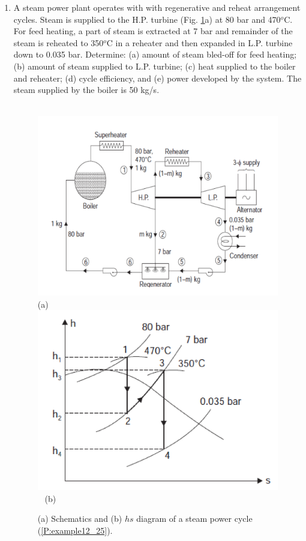 \documentclass[12pts,a4paper,amsmath,amssymb,floatfix]{article}%
\begin{document}
\begin{enumerate}[label=\bfseries Problem \arabic*]
\item\label{P:example12_25} A steam power plant operates with with regenerative and reheat arrangement cycles. Steam is supplied to the H.P. turbine (Fig. \ref{example12_25}a) at 80 bar and 470$^{o}$C.  For feed heating, a part of steam is extracted at 7 bar and remainder of the steam is reheated to 350$^{o}$C in a reheater and then expanded in L.P. turbine down to 0.035 bar. Determine: (a) amount of steam bled-off for feed heating; (b) amount of steam supplied to L.P. turbine; (c) heat supplied to the boiler and reheater; (d) cycle efficiency, and (e) power developed by the system. The steam supplied by the boiler is 50 kg/s.
   \begin{figure}[h]
    \begin{center}
    \vbox{
     \hbox{\hspace{1cm}
      \includegraphics[width=12.cm,clip]{./Pics/Exemple12_25a_Rajput}}
     \hbox{\hspace{7.5cm}(a)}
     \hbox{\hspace{1.cm}
      \includegraphics[width=12.cm,clip]{./Pics/Exemple12_25b_Rajput}
      }
     \hbox{\hspace{7.5cm}(b)}}
     \caption{ (a) Schematics and (b) $hs$ diagram of a steam power cycle (\ref{P:example12_25}).}
     \label{example12_25}
     \end{center}
   \end{figure}
 



\end{enumerate}
\end{document}
